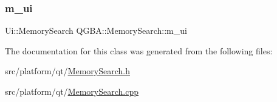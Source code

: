 \subsubsection{\texorpdfstring{m\+\_\+ui}{m\_ui}}
{\footnotesize\ttfamily Ui\+::\+Memory\+Search Q\+G\+B\+A\+::\+Memory\+Search\+::m\+\_\+ui\hspace{0.3cm}{\ttfamily [private]}}



The documentation for this class was generated from the following files\+:\begin{DoxyCompactItemize}
\item 
src/platform/qt/\mbox{\hyperlink{_memory_search_8h}{Memory\+Search.\+h}}\item 
src/platform/qt/\mbox{\hyperlink{_memory_search_8cpp}{Memory\+Search.\+cpp}}\end{DoxyCompactItemize}
